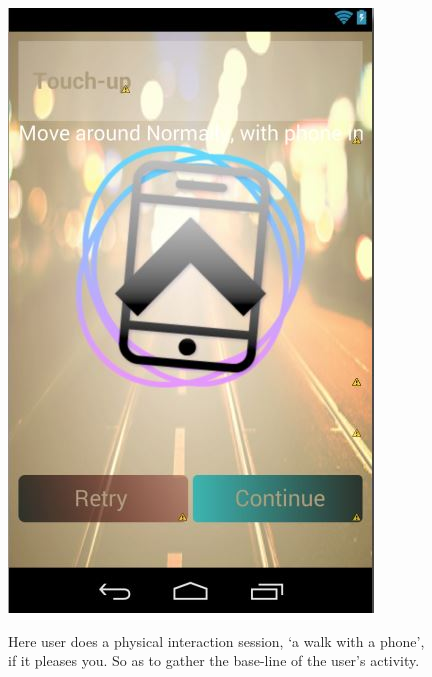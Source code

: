 \begin{figure}[h]
	\centering
	\includegraphics[height=0.35\textheight]{fig01/s_walk}
	\label{fig:RHP03}

Here user does a physical interaction session, `a walk with a phone', if it pleases you. So as to gather the base-line of the user's activity.
\end{figure}

